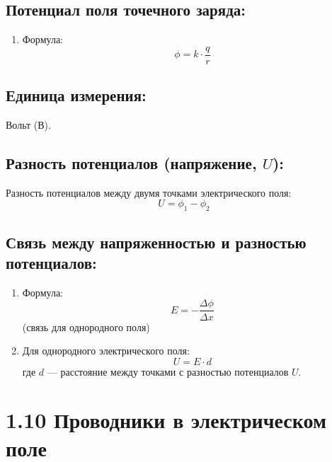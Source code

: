 \documentclass[a4paper,12pt]{article}
\begin{document}
\vspace{-9pt}
\subsection*{Потенциал поля точечного заряда:}
\vspace{-3pt}
\begin{enumerate}[itemsep=0pt, topsep=0pt, parsep=3pt]
  \item Формула:
  \vspace{-0.05em}
  $$ \phi = k \cdot \frac{q}{r} $$
\end{enumerate}

\vspace{-9pt}
\subsection*{Единица измерения:}
\vspace{-3pt}
Вольт (В).

\vspace{-9pt}
\subsection*{Разность потенциалов (напряжение, $U$):}
\vspace{-3pt}
Разность потенциалов между двумя точками электрического поля:
\vspace{-0.05em}
$$ U = \phi_1 - \phi_2 $$

\vspace{-9pt}
\subsection*{Связь между напряженностью и разностью потенциалов:}
\vspace{-3pt}
\begin{enumerate}[itemsep=0pt, topsep=0pt, parsep=3pt]
  \item Формула:
  \vspace{-0.05em}
  $$ E = - \frac{\Delta \phi}{\Delta x} $$
  (связь для однородного поля)
  \item Для однородного электрического поля:
  \vspace{-0.05em}
  $$ U = E \cdot d $$
  где $d$ — расстояние между точками с разностью потенциалов $U$.
\end{enumerate}

\section*{1.10 Проводники в электрическом поле}
\vspace{-9pt}
\end{document}
